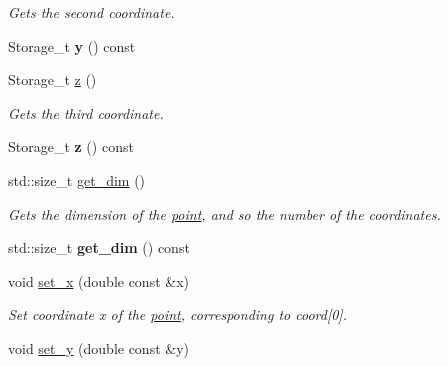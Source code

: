\begin{DoxyCompactItemize}
\begin{DoxyCompactList}\small\item\em Gets the second coordinate. \item\end{DoxyCompactList}\item 
\hypertarget{classBGLgeom_1_1point_a8f398dfd0e0a8a46a323006775eb3b78}{
Storage\_\-t {\bfseries y} () const }
\label{classBGLgeom_1_1point_a8f398dfd0e0a8a46a323006775eb3b78}

\item 
\hypertarget{classBGLgeom_1_1point_a03ee6fc818c7ca8f51ed8b4973605bb6}{
Storage\_\-t \hyperlink{classBGLgeom_1_1point_a03ee6fc818c7ca8f51ed8b4973605bb6}{z} ()}
\label{classBGLgeom_1_1point_a03ee6fc818c7ca8f51ed8b4973605bb6}

\begin{DoxyCompactList}\small\item\em Gets the third coordinate. \item\end{DoxyCompactList}\item 
\hypertarget{classBGLgeom_1_1point_a250d0ffc04b977cde4917a8885c8c969}{
Storage\_\-t {\bfseries z} () const }
\label{classBGLgeom_1_1point_a250d0ffc04b977cde4917a8885c8c969}

\item 
\hypertarget{classBGLgeom_1_1point_a23931e355d80c43bbf6f1c5b2201cb54}{
std::size\_\-t \hyperlink{classBGLgeom_1_1point_a23931e355d80c43bbf6f1c5b2201cb54}{get\_\-dim} ()}
\label{classBGLgeom_1_1point_a23931e355d80c43bbf6f1c5b2201cb54}

\begin{DoxyCompactList}\small\item\em Gets the dimension of the \hyperlink{classBGLgeom_1_1point}{point}, and so the number of the coordinates. \item\end{DoxyCompactList}\item 
\hypertarget{classBGLgeom_1_1point_a4598aba4baf8b4d9ec866c51b61a8308}{
std::size\_\-t {\bfseries get\_\-dim} () const }
\label{classBGLgeom_1_1point_a4598aba4baf8b4d9ec866c51b61a8308}

\item 
\hypertarget{classBGLgeom_1_1point_abca07b8aa1bb530bd2ffde0bebaa009a}{
void \hyperlink{classBGLgeom_1_1point_abca07b8aa1bb530bd2ffde0bebaa009a}{set\_\-x} (double const \&x)}
\label{classBGLgeom_1_1point_abca07b8aa1bb530bd2ffde0bebaa009a}

\begin{DoxyCompactList}\small\item\em Set coordinate x of the \hyperlink{classBGLgeom_1_1point}{point}, corresponding to coord\mbox{[}0\mbox{]}. \item\end{DoxyCompactList}\item 
\hypertarget{classBGLgeom_1_1point_aa853ba3c0c016347388ce47ea70fbb53}{
void \hyperlink{classBGLgeom_1_1point_aa853ba3c0c016347388ce47ea70fbb53}{set\_\-y} (double const \&y)}
\label{classBGLgeom_1_1point_aa853ba3c0c016347388ce47ea70fbb53}


\end{DoxyCompactItemize}
